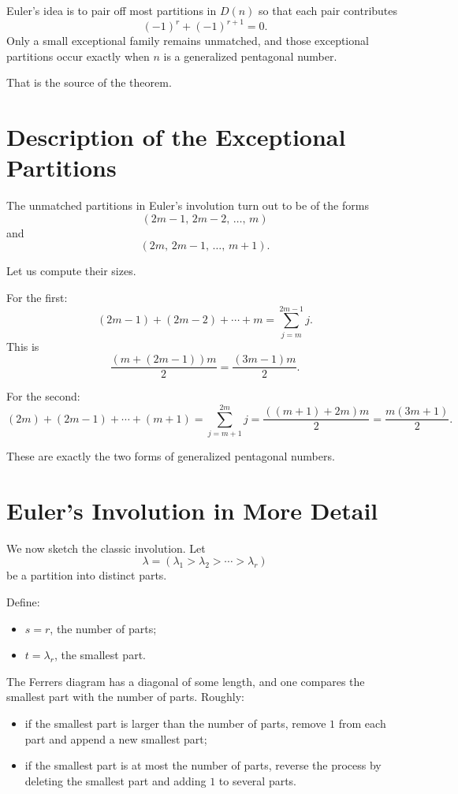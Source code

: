 \documentclass[11pt]{article}
\theoremstyle{definition}
\theoremstyle{remark}
\begin{document}
	Euler's idea is to pair off most partitions in \(D(n)\) so that each pair contributes
	\[
	(-1)^r+(-1)^{r+1}=0.
	\]
	Only a small exceptional family remains unmatched, and those exceptional partitions occur exactly when \(n\) is a generalized pentagonal number.
	
	That is the source of the theorem.
	
	\section{Description of the Exceptional Partitions}
	
	The unmatched partitions in Euler's involution turn out to be of the forms
	\[
	(2m-1,\,2m-2,\,\dots,\,m)
	\]
	and
	\[
	(2m,\,2m-1,\,\dots,\,m+1).
	\]
	
	Let us compute their sizes.
	
	For the first:
	\[
	(2m-1)+(2m-2)+\cdots+m
	=
	\sum_{j=m}^{2m-1} j.
	\]
	This is
	\[
	\frac{(m+(2m-1))m}{2}
	=
	\frac{(3m-1)m}{2}.
	\]
	
	For the second:
	\[
	(2m)+(2m-1)+\cdots+(m+1)
	=
	\sum_{j=m+1}^{2m} j
	=
	\frac{((m+1)+2m)m}{2}
	=
	\frac{m(3m+1)}{2}.
	\]
	
	These are exactly the two forms of generalized pentagonal numbers.
	
	\section{Euler's Involution in More Detail}
	
	We now sketch the classic involution. Let
	\[
	\lambda=(\lambda_1>\lambda_2>\cdots>\lambda_r)
	\]
	be a partition into distinct parts.
	
	Define:
	\begin{itemize}
		\item \(s=r\), the number of parts;
		\item \(t=\lambda_r\), the smallest part.
	\end{itemize}
	
	The Ferrers diagram has a diagonal of some length, and one compares the smallest part with the number of parts. Roughly:
	\begin{itemize}
		\item if the smallest part is larger than the number of parts, remove \(1\) from each part and append a new smallest part;
		\item if the smallest part is at most the number of parts, reverse the process by deleting the smallest part and adding \(1\) to several parts.
	\end{itemize}
	
\end{document}
